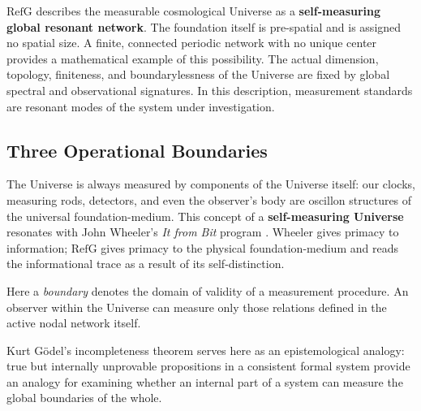 \documentclass[11pt,a4paper]{article}
\newcommand{\RefG}{\mathrm{RefG}}
\begin{document}
$\RefG$ describes the measurable cosmological Universe as a \textbf{self-measuring global resonant network}. The foundation itself is pre-spatial and is assigned no spatial size. A finite, connected periodic network with no unique center provides a mathematical example of this possibility. The actual dimension, topology, finiteness, and boundarylessness of the Universe are fixed by global spectral and observational signatures. In this description, measurement standards are resonant modes of the system under investigation.

\subsection{Three Operational Boundaries}

The Universe is always measured by components of the Universe itself: our clocks, measuring rods, detectors, and even the observer's body are oscillon structures of the universal foundation-medium. This concept of a \textbf{self-measuring Universe} resonates with John Wheeler's \emph{It from Bit} program \citep{wheeler1990}. Wheeler gives primacy to information; $\RefG$ gives primacy to the physical foundation-medium and reads the informational trace as a result of its self-distinction.

Here a \emph{boundary} denotes the domain of validity of a measurement procedure. An observer within the Universe can measure only those relations defined in the active nodal network itself.

Kurt Gödel's incompleteness theorem \citep{godel1931} serves here as an epistemological analogy: true but internally unprovable propositions in a consistent formal system provide an analogy for examining whether an internal part of a system can measure the global boundaries of the whole.
\end{document}
